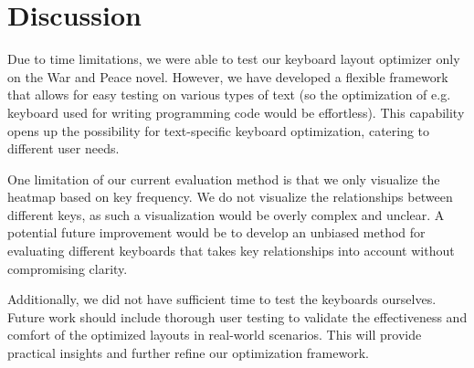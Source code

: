 \documentclass[9pt,twocolumn,twoside]{pnas-report}
\begin{document}
\section*{Discussion}

Due to time limitations, we were able to test our keyboard layout optimizer only on the War and Peace novel.
However, we have developed a flexible framework that allows for easy testing on various types of text (so the optimization of e.g. keyboard used for writing programming code would be effortless).
This capability opens up the possibility for text-specific keyboard optimization, catering to different user needs.

One limitation of our current evaluation method is that we only visualize the heatmap based on key frequency.
We do not visualize the relationships between different keys, as such a visualization would be overly complex and unclear.
A potential future improvement would be to develop an unbiased method for evaluating different keyboards that takes key relationships into account without compromising clarity.

Additionally, we did not have sufficient time to test the keyboards ourselves.
Future work should include thorough user testing to validate the effectiveness and comfort of the optimized layouts in real-world scenarios.
This will provide practical insights and further refine our optimization framework.
\end{document}
